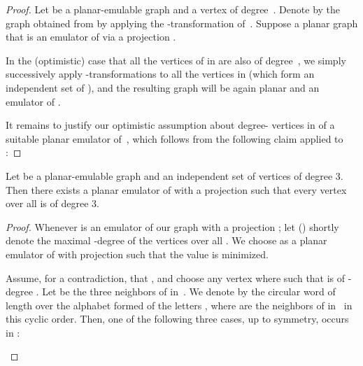 \documentclass[envcountsect,envcountsame]{llncs}
\renewenvironment{accumulate}{}{}
\begin{document}
\begin{accumulate}
\begin{proof}
Let  be a planar-emulable graph and  a vertex of degree~.
Denote by  the graph obtained from  by applying the
-transformation of~.
Suppose a planar graph  that is an emulator of  via a projection .

In the (optimistic) case that all the vertices of  in 
are also of degree~,
we simply successively apply -transformations to all the vertices in
 (which form an independent set of ),
and the resulting graph  will be again planar and an emulator of .

It remains to justify our optimistic assumption about degree- vertices in
 of a suitable planar emulator  of~, which
follows from the following claim applied to :
\end{proof}

\begin{lemma}\label{lem:cubic_vert}
Let  be a planar-emulable graph
and  an independent set of vertices of degree 3. 
Then there exists a planar emulator  of  with a projection 
 such that every vertex 
 over all  is of degree 3. 
\end{lemma}

\begin{proof}
Whenever  is an emulator of our graph  with a projection ;
let  () shortly denote the maximal -degree of the vertices 
 over all . 
We choose  as a planar emulator of  with projection  such
that the value  is minimized.

Assume, for a contradiction, that , and choose any vertex
 where  such that  is of -degree .
Let  be the three neighbors of  in~.
We denote by  the circular word of length  over the alphabet
 formed of the letters
, where  are the
neighbors of  in~ in this cyclic order.
Then, one of the following three cases, up to symmetry, occurs in :

\begin{figure}[t]
  \centering
  \def \svgwidth{\columnwidth}
  


\end{figure}
\end{proof}
\end{accumulate}
\end{document}
